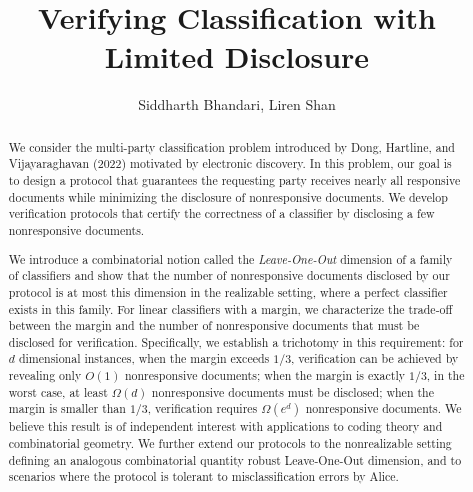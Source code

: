 \documentclass[11pt]{article}
\title{Verifying Classification with Limited Disclosure}
\author{Siddharth Bhandari, Liren Shan}
\date{}
\begin{document}
\maketitle

\begin{abstract}%
  We consider the multi-party classification problem introduced by Dong, Hartline, and Vijayaraghavan (2022) motivated by electronic discovery. In this problem, our goal is to design a protocol that guarantees the requesting party receives nearly all responsive documents while minimizing the disclosure of nonresponsive documents. We develop verification protocols that certify the correctness of a classifier by disclosing a few nonresponsive documents. 
  
  We introduce a combinatorial notion called the \emph{Leave-One-Out} dimension of a family of classifiers and show that the number of nonresponsive documents disclosed by our protocol is at most this dimension in the realizable setting, where a perfect classifier exists in this family. 
  For linear classifiers with a margin, we characterize the trade-off between the margin and the number of nonresponsive documents that must be disclosed for verification. Specifically, we establish a trichotomy in this requirement:
  for $d$ dimensional instances, when the margin exceeds $1/3$, verification can be achieved by revealing only $O(1)$ nonresponsive documents; when the margin is exactly $1/3$, in the worst case, at least $\Omega(d)$ nonresponsive documents must be disclosed; when the margin is smaller than $1/3$, verification requires $\Omega(e^d)$ nonresponsive documents.
  We believe this result is of {independent interest} with applications to {coding theory} and {combinatorial geometry}.
  We further extend our protocols to the nonrealizable setting defining an analogous combinatorial quantity robust Leave-One-Out dimension, and to scenarios where the protocol is tolerant to misclassification errors by Alice.
\end{abstract}











\newpage

\appendix






%
\end{document}
